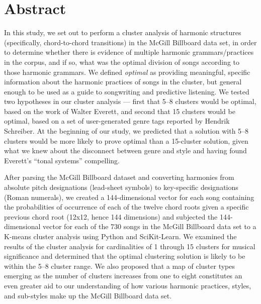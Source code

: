 
\def\mytitle{A cluster analysis of harmony in the McGill Billboard data set}
\def\subtitle{}
\def\myauthor{Kris P. Shaffer, et al.}
\def\latexmode{memoir}


\chapter{Abstract}
\label{abstract}

In this study, we set out to perform a cluster analysis of harmonic structures (specifically, chord-to-chord transitions) in the McGill Billboard data set, in order to determine whether there is evidence of multiple harmonic grammars\slash practices in the corpus, and if so, what was the optimal division of songs according to those harmonic grammars. We defined \emph{optimal} as providing meaningful, specific information about the harmonic practices of songs in the cluster, but general enough to be used as a guide to songwriting and predictive listening. We tested two hypotheses in our cluster analysis — first that 5–8 clusters would be optimal, based on the work of Walter Everett, and second that 15 clusters would be optimal, based on a set of user-generated genre tags reported by Hendrik Schreiber. At the beginning of our study, we predicted that a solution with 5–8 clusters would be more likely to prove optimal than a 15-cluster solution, given what we knew about the disconnect between genre and style and having found Everett's ``tonal systems'' compelling.

After parsing the McGill Billboard dataset and converting harmonies from absolute pitch designations (lead-sheet symbols) to key-specific designations (Roman numerals), we created a 144-dimensional vector for each song containing the probabilities of occurrence of each of the twelve chord roots given a specific previous chord root (12x12, hence 144 dimensions) and subjected the 144-dimensional vector for each of the 730 songs in the McGill Billboard data set to a K-means cluster analysis using Python and SciKit-Learn. We examined the results of the cluster analysis for cardinalities of 1 through 15 clusters for musical significance and determined that the optimal clustering solution is likely to be within the 5–8 cluster range. We also proposed that a map of cluster types emerging as the number of clusters increases from one to eight constitutes an even greater aid to our understanding of how various harmonic practices, styles, and sub-styles make up the McGill Billboard data set.

